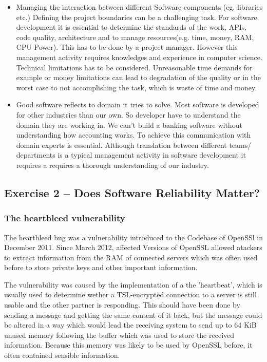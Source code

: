 \documentclass{scrartcl}
\begin{document}
\begin{itemize}
\item Managing the interaction between different Software components (eg. libraries etc.)
Defining the project boundaries can be a challenging task. 
For software development it is essential to determine the standards of the work,
APIs, code quality, architecture and to manage resources(e.g. time, money, RAM, CPU-Power). 
This has to be done by a project manager. However this management activity requires knowledges 
and experience in computer science. Technical limitations has to be considered. 
Unreasonable time demands for example or money limitations can lead to degradation of the quality 
or in the worst case to not accomplishing the task, which is waste of time and money.

\item Good software reflects to domain it tries to solve.
Most software is developed for other industries than our own. So developer have to understand the domain they are working in. We can't build a banking software without understanding how accounting works.
To achieve this communication with domain experts is essential. 
Although translation between different teams/ departments is a typical management activity in software development it requires a requires a thorough understanding of our industry.
\end{itemize}

\subsection*{Exercise 2 – Does Software Reliability Matter?}

\subsubsection*{The heartbleed vulnerability}

The heartbleed bug was a vulnerability introduced to the Codebase of OpenSSl in December 2011. Since March 2012, affected Versions of OpenSSL allowed atackers to extract information from the RAM of connected servers which was often used before to store private keys and other important information.

The vulnerability was caused by the implementation of a the 'heartbeat', which is usually used to determine wether a TSL-encrypted connection to a server is still usable and the other partner is responding. This should have been done by sending a message and getting the same content of it back, but the message could be altered in a way which would lead the receiving system to send up to 64 KiB unused memory following the buffer which was used to store the received information. Because this memory was likely to be used by OpenSSL before, it often contained sensible information.\\
\end{document}
